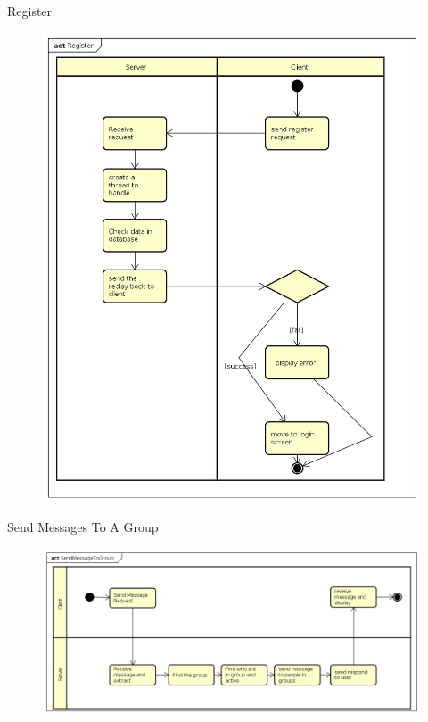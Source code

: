 \documentclass{beamer}
\begin{document}
\begin{frame}{Register}
\begin{figure}
\includegraphics[scale=0.2]{Register.png}
\end{figure}
\end{frame}

\begin{frame}{Send Messages To A Group}
\begin{figure}
\includegraphics[scale=0.3]{SendMessageToGroup.png}
\end{figure}
\end{frame}
\end{document}

